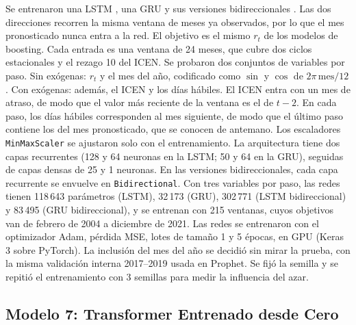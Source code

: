 \documentclass[conference]{IEEEtran}
\newcommand{\code}[1]{\texttt{#1}}
\begin{document}
Se entrenaron una LSTM \cite{hochreiter1997}, una GRU \cite{cho2014} y sus versiones bidireccionales \cite{schuster1997}. Las dos direcciones recorren la misma ventana de meses ya observados, por lo que el mes pronosticado nunca entra a la red. El objetivo es el mismo $r_t$ de los modelos de boosting. Cada entrada es una ventana de 24 meses, que cubre dos ciclos estacionales y el rezago 10 del ICEN. Se probaron dos conjuntos de variables por paso. Sin exógenas: $r_t$ y el mes del año, codificado como $\sin$ y $\cos$ de $2\pi\,\mathrm{mes}/12$. Con exógenas: además, el ICEN y los días hábiles. El ICEN entra con un mes de atraso, de modo que el valor más reciente de la ventana es el de $t-2$. En cada paso, los días hábiles corresponden al mes siguiente, de modo que el último paso contiene los del mes pronosticado, que se conocen de antemano. Los escaladores \code{MinMaxScaler} se ajustaron solo con el entrenamiento. La arquitectura tiene dos capas recurrentes (128 y 64 neuronas en la LSTM; 50 y 64 en la GRU), seguidas de capas densas de 25 y 1 neuronas. En las versiones bidireccionales, cada capa recurrente se envuelve en \code{Bidirectional}. Con tres variables por paso, las redes tienen 118\,643 parámetros (LSTM), 32\,173 (GRU), 302\,771 (LSTM bidireccional) y 83\,495 (GRU bidireccional), y se entrenan con 215 ventanas, cuyos objetivos van de febrero de 2004 a diciembre de 2021. Las redes se entrenaron con el optimizador Adam, pérdida MSE, lotes de tamaño 1 y 5 épocas, en GPU (Keras 3 sobre PyTorch). La inclusión del mes del año se decidió sin mirar la prueba, con la misma validación interna 2017--2019 usada en Prophet. Se fijó la semilla y se repitió el entrenamiento con 3 semillas para medir la influencia del azar.

\subsection{Modelo 7: Transformer Entrenado desde Cero}
\end{document}
